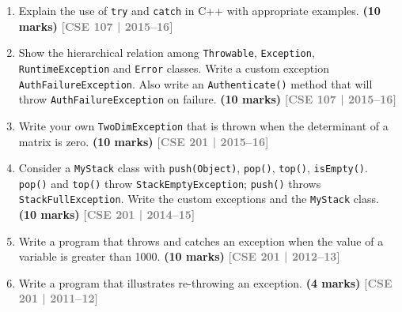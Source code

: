 \documentclass[12pt,a3paper]{article}
\newcommand{\yr}[1]{\hfill\textcolor{gray}{\small\textbf{[#1]}}}
\newcommand{\mk}[1]{\textcolor{orange!70!black}{\small\textbf{(#1 marks)}}}
\begin{document}
\begin{enumerate}



\item Explain the use of \texttt{try} and \texttt{catch} in C++ with appropriate examples. \mk{10}
\yr{CSE 107 | 2015--16}






\item Show the hierarchical relation among \texttt{Throwable}, \texttt{Exception}, \texttt{RuntimeException} and \texttt{Error} classes. Write a custom exception \texttt{AuthFailureException}. Also write an \texttt{Authenticate()} method that will throw \texttt{AuthFailureException} on failure. \mk{10}
\yr{CSE 107 | 2015--16}




\item Write your own \texttt{TwoDimException} that is thrown when the determinant of a matrix is zero. \mk{10}
\yr{CSE 201 | 2015--16}






\item Consider a \texttt{MyStack} class with \texttt{push(Object)}, \texttt{pop()}, \texttt{top()}, \texttt{isEmpty()}. \texttt{pop()} and \texttt{top()} throw \texttt{StackEmptyException}; \texttt{push()} throws \texttt{StackFullException}. Write the custom exceptions and the \texttt{MyStack} class. \mk{10}
\yr{CSE 201 | 2014--15}






\item Write a program that throws and catches an exception when the value of a variable is greater than 1000. \mk{10}
\yr{CSE 201 | 2012--13}






\item Write a program that illustrates re-throwing an exception. \mk{4}
\yr{CSE 201 | 2011--12}


\end{enumerate}
\end{document}
